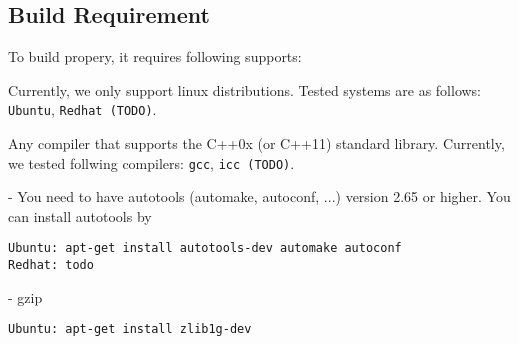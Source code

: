 \subsection{Build Requirement}

To build \SIM propery, it requires following supports:

\begingroup
\renewcommand\descriptionlabel[1]{\textit{\hspace\labelsep{#1}}}
\begin{description}\firmlist
  \item[Operating System] Currently, we only support linux
    distributions. Tested systems are as follows: \Verb+Ubuntu+, \Verb+Redhat (TODO)+.
  \item[Compiler] Any compiler that supports the C++0x (or C++11)
    standard library. Currently, we tested follwing compilers: \Verb+gcc+, \Verb+icc (TODO)+.
  \item[Autotools] - You need to have autotools (automake, autoconf,
    ...) version 2.65 or higher. You can install autotools by
\begin{Verbatim}
Ubuntu: apt-get install autotools-dev automake autoconf
Redhat: todo
\end{Verbatim}
  \item[Libraries] - gzip
\begin{Verbatim}
Ubuntu: apt-get install zlib1g-dev
\end{Verbatim}
\end{description}
\endgroup





